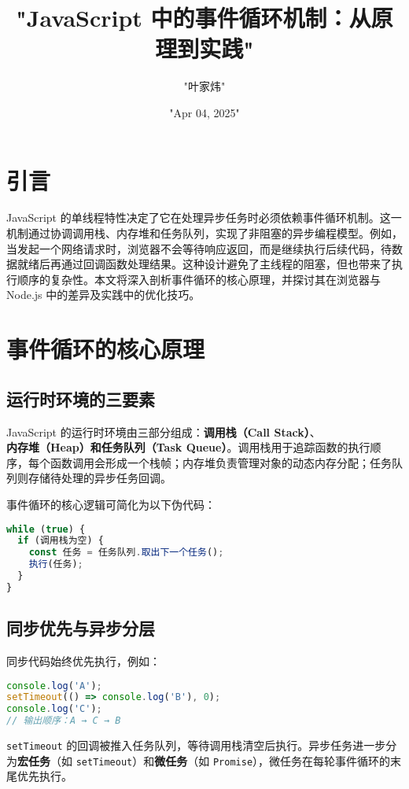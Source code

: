 \title{"JavaScript 中的事件循环机制：从原理到实践"}
\author{"叶家炜"}
\date{"Apr 04, 2025"}
\maketitle
\chapter{引言}
JavaScript 的单线程特性决定了它在处理异步任务时必须依赖事件循环机制。这一机制通过协调调用栈、内存堆和任务队列，实现了非阻塞的异步编程模型。例如，当发起一个网络请求时，浏览器不会等待响应返回，而是继续执行后续代码，待数据就绪后再通过回调函数处理结果。这种设计避免了主线程的阻塞，但也带来了执行顺序的复杂性。本文将深入剖析事件循环的核心原理，并探讨其在浏览器与 Node.js 中的差异及实践中的优化技巧。\par
\chapter{事件循环的核心原理}
\section{运行时环境的三要素}
JavaScript 的运行时环境由三部分组成：\textbf{调用栈（Call Stack）}、\textbf{内存堆（Heap）\textbf{和}任务队列（Task Queue）}。调用栈用于追踪函数的执行顺序，每个函数调用会形成一个栈帧；内存堆负责管理对象的动态内存分配；任务队列则存储待处理的异步任务回调。\par
事件循环的核心逻辑可简化为以下伪代码：\par
\begin{lstlisting}[language=javascript]
while (true) {
  if (调用栈为空) {
    const 任务 = 任务队列.取出下一个任务();
    执行(任务);
  }
}
\end{lstlisting}
\section{同步优先与异步分层}
同步代码始终优先执行，例如：\par
\begin{lstlisting}[language=javascript]
console.log('A');
setTimeout(() => console.log('B'), 0);
console.log('C');
// 输出顺序：A → C → B
\end{lstlisting}
\verb!setTimeout! 的回调被推入任务队列，等待调用栈清空后执行。异步任务进一步分为\textbf{宏任务}（如 \verb!setTimeout!）和\textbf{微任务}（如 \verb!Promise!），微任务在每轮事件循环的末尾优先执行。\par
